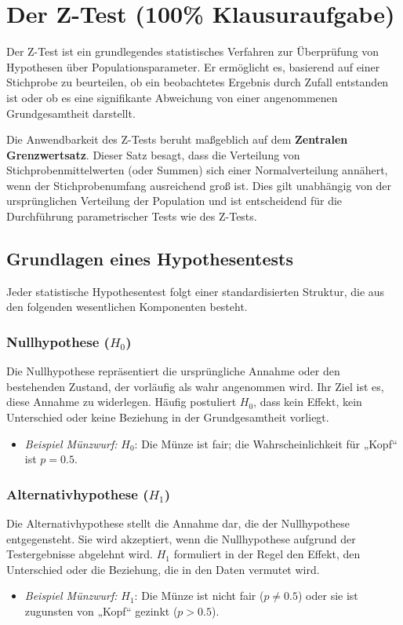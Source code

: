 \chapter{Der Z-Test (100\% Klau\-sur\-auf\-gabe)}

Der Z-Test ist ein grundlegendes statistisches Verfahren zur Überprüfung von
Hypothesen über Populationsparameter. Er ermöglicht es, basierend auf einer
Stichprobe zu beurteilen, ob ein beobachtetes Ergebnis durch Zufall entstanden
ist oder ob es eine signifikante Abweichung von einer angenommenen
Grundgesamtheit darstellt.

Die Anwendbarkeit des Z-Tests beruht maßgeblich auf dem \textbf{Zentralen
    Grenzwertsatz}. Dieser Satz besagt, dass die Verteilung von
Stichprobenmittelwerten (oder Summen) sich einer Normalverteilung annähert,
wenn der Stichprobenumfang ausreichend groß ist. Dies gilt unabhängig von der
ursprünglichen Verteilung der Population und ist entscheidend für die
Durchführung parametrischer Tests wie des Z-Tests.

\section{Grundlagen eines Hypothesentests}

Jeder statistische Hypothesentest folgt einer standardisierten Struktur, die
aus den folgenden wesentlichen Komponenten besteht.

\subsection{Nullhypothese ($H_0$)}
Die Nullhypothese repräsentiert die ursprüngliche Annahme oder den bestehenden
Zustand, der vorläufig als wahr angenommen wird. Ihr Ziel ist es, diese Annahme
zu widerlegen. Häufig postuliert $H_0$, dass kein Effekt, kein Unterschied oder
keine Beziehung in der Grundgesamtheit vorliegt.
\begin{itemize}
    \item \textit{Beispiel Münzwurf:} $H_0$: Die Münze ist fair; die Wahrscheinlichkeit für „Kopf“ ist $p = 0.5$.
\end{itemize}

\subsection{Alternativhypothese ($H_1$)}
Die Alternativhypothese stellt die Annahme dar, die der Nullhypothese
entgegensteht. Sie wird akzeptiert, wenn die Nullhypothese aufgrund der
Testergebnisse abgelehnt wird. $H_1$ formuliert in der Regel den Effekt, den
Unterschied oder die Beziehung, die in den Daten vermutet wird.
\begin{itemize}
    \item \textit{Beispiel Münzwurf:} $H_1$: Die Münze ist nicht fair ($p \neq 0.5$) oder sie ist zugunsten von „Kopf“ gezinkt ($p > 0.5$).
\end{itemize}


